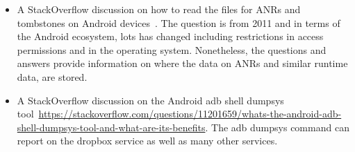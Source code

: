 \begin{itemize}
    \item A StackOverflow discussion on how to read the files for ANRs and tombstones on Android devices~\citep{learner2011_so_how_to_access_anrs_and_tombstones}. The question is from 2011 and in terms of the Android ecosystem, lots has changed including restrictions in access permissions and in the operating system. Nonetheless, the questions and answers provide information on where the data on ANRs and similar runtime data, are stored.
    \item A StackOverflow discussion on the Android adb shell dumpsys tool~\url{https://stackoverflow.com/questions/11201659/whats-the-android-adb-shell-dumpsys-tool-and-what-are-its-benefits}. The adb dumpsys command can report on the dropbox service as well as many other services. 
\end{itemize}

